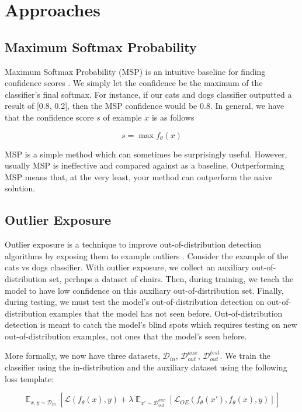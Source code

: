 \documentclass{article}
\newcommand{\D}{\mathcal{D}}
\DeclareMathOperator*{\E}{\mathbb{E}}
\newcommand{\loss}{\mathcal{L}}
\begin{document}
\section{Approaches}

\subsection{Maximum Softmax Probability}
Maximum Softmax Probability (MSP) is an intuitive baseline for finding confidence scores \cite{hendrycks2018baseline}. We simply let the confidence be the maximum of the classifier’s final softmax. For instance, if our cats and dogs classifier outputted a result of [0.8, 0.2], then the MSP confidence would be 0.8. In general, we have that the confidence score $s$ of example $x$ is as follows

\[
     s = \max f_\theta(x)
\]

MSP is a simple method which can sometimes be surprisingly useful. However, usually MSP is ineffective and compared against as a baseline. Outperforming MSP means that, at the very least, your method can outperform the naive solution.

\subsection{Outlier Exposure}
Outlier exposure is a technique to improve out-of-distribution detection algorithms by exposing them to example outliers \cite{hendrycks2019deep}. Consider the example of the cats vs dogs classifier. With outlier exposure, we collect an auxiliary out-of-distribution set, perhaps a dataset of chairs. Then, during training, we teach the model to have low confidence on this auxiliary out-of-distribution set. Finally, during testing, we must test the model’s out-of-distribution detection on out-of-distribution examples that the model has not seen before. Out-of-distribution detection is meant to catch the model’s blind spots which requires testing on new out-of-distribution examples, not ones that the model’s seen before. 

More formally, we now have three datasets, $\D_{in}$, $\D_{out}^{aux}$, $\D_{out}^{test}$. We train the classifier using the in-distribution and the auxiliary dataset using the following loss template:

\[
    \E_{x,y \sim \D_{in}}[\loss(f_\theta(x), y) + \lambda \E_{x' \sim \D_{out}^{aux}} [\loss_{OE}(f_\theta(x'), f_\theta(x), y)]]
\]
\end{document}
